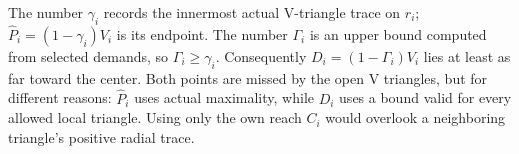The number $\gamma_i$ records the innermost actual V-triangle trace on
$r_i$; $\widehat P_i=(1-\gamma_i)V_i$ is its endpoint. The number $\Gamma_i$
is an upper bound computed from selected demands, so $\Gamma_i\ge\gamma_i$.
Consequently $D_i=(1-\Gamma_i)V_i$ lies at least as far toward the center.
Both points are missed by the open V triangles, but for different reasons:
$\widehat P_i$ uses actual maximality, while $D_i$ uses a bound valid for every
allowed local triangle. Using only the own reach $C_i$ would overlook a
neighboring triangle's positive radial trace.
